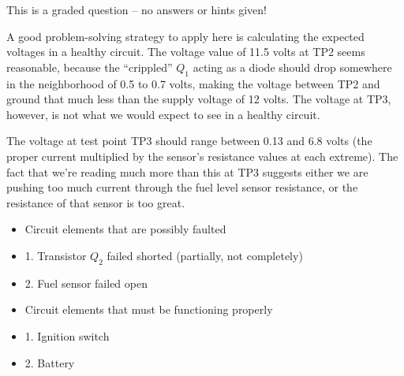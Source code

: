 This is a graded question -- no answers or hints given!







A good problem-solving strategy to apply here is calculating the expected voltages in a healthy circuit.  The voltage value of 11.5 volts at TP2 seems reasonable, because the ``crippled'' $Q_1$ acting as a diode should drop somewhere in the neighborhood of 0.5 to 0.7 volts, making the voltage between TP2 and ground that much less than the supply voltage of 12 volts.  The voltage at TP3, however, is not what we would expect to see in a healthy circuit.

\vskip 10pt

The voltage at test point TP3 should range between 0.13 and 6.8 volts (the proper current multiplied by the sensor's resistance values at each extreme).  The fact that we're reading much more than this at TP3 suggests either we are pushing too much current through the fuel level sensor resistance, or the resistance of that sensor is too great.

\begin{itemize}
\item{} Circuit elements that are possibly faulted
\item{1.} Transistor $Q_2$ failed shorted (partially, not completely)
\item{2.} Fuel sensor failed open
\end{itemize}

\begin{itemize}
\item{} Circuit elements that must be functioning properly
\item{1.} Ignition switch
\item{2.} Battery
\end{itemize}




